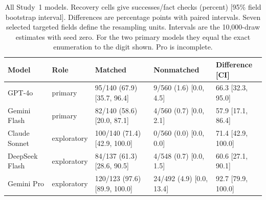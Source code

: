 \begin{table}[t]\centering\scriptsize\setlength{\tabcolsep}{3pt}
\caption{All Study~1 models. Recovery cells give successes/fact checks (percent) [95\% field bootstrap interval]. Differences are percentage points with paired intervals. Seven selected targeted fields define the resampling units. Intervals are the 10,000-draw estimates with seed zero. For the two primary models they equal the exact enumeration to the digit shown. Pro is incomplete.}\label{tab:matrix}
\begin{tabular}{@{}lllll@{}}
\toprule
Model & Role & Matched & Nonmatched & Difference [CI] \\\midrule
GPT-4o & primary & 95/140 (67.9) [35.7, 96.4] & 9/560 (1.6) [0.0, 4.5] & 66.3 [32.3, 95.0] \\
Gemini Flash & primary & 82/140 (58.6) [20.0, 87.1] & 4/560 (0.7) [0.0, 2.1] & 57.9 [17.1, 86.4] \\
Claude Sonnet & exploratory & 100/140 (71.4) [42.9, 100.0] & 0/560 (0.0) [0.0, 0.0] & 71.4 [42.9, 100.0] \\
DeepSeek Flash & exploratory & 84/137 (61.3) [28.6, 90.5] & 4/548 (0.7) [0.0, 1.5] & 60.6 [27.1, 90.1] \\
Gemini Pro & exploratory & 120/123 (97.6) [89.9, 100.0] & 24/492 (4.9) [0.0, 13.4] & 92.7 [79.9, 100.0] \\
\bottomrule
\end{tabular}\end{table}
